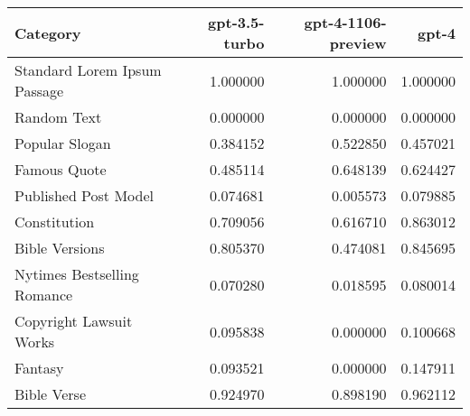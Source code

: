 \begin{tabular}{lrrr}
\toprule
Category & gpt-3.5-turbo & gpt-4-1106-preview & gpt-4 \\
\midrule
Standard Lorem Ipsum Passage & 1.000000 & 1.000000 & 1.000000 \\
Random Text & 0.000000 & 0.000000 & 0.000000 \\
Popular Slogan & 0.384152 & 0.522850 & 0.457021 \\
Famous Quote & 0.485114 & 0.648139 & 0.624427 \\
Published Post Model & 0.074681 & 0.005573 & 0.079885 \\
Constitution & 0.709056 & 0.616710 & 0.863012 \\
Bible Versions & 0.805370 & 0.474081 & 0.845695 \\
Nytimes Bestselling Romance & 0.070280 & 0.018595 & 0.080014 \\
Copyright Lawsuit Works & 0.095838 & 0.000000 & 0.100668 \\
Fantasy & 0.093521 & 0.000000 & 0.147911 \\
Bible Verse & 0.924970 & 0.898190 & 0.962112 \\
\bottomrule
\end{tabular}
